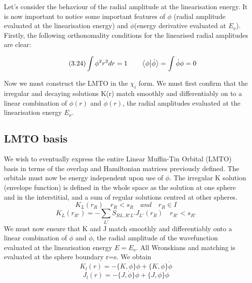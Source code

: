 \documentclass[12pt]{article}
\begin{document}
Let's consider the behaviour of the radial amplitude at the linearisation energy. It is now important to notice some important features of $\phi$ (radial amplitude evaluated at the linearisation energy) and $\dot{\phi}$(energy derivative evaluated at $E_\nu$). Firstly, the following orthonomality conditions for the linearised radial amplitudes are clear:

\begin{equation} \label{3.20} \tag{3.24}
\int \phi^2 r^2 dr=1 \qquad \bra{\phi}\ket{\dot{\phi}}=\int \dot{\phi}\phi=0
\end{equation}

Now we must construct the LMTO in the $\chi_i$ form. We must first confirm that the irregular and decaying solutions K(r) match smoothly and differentiably on to a linear combination of $\phi(r)$ and $\dot{\phi}(r)$, the radial amplitudes evaluated at the linearisation energy $E_\nu$. 

\subsection{LMTO basis}

We wish to eventually express the entire Linear Muffin-Tin Orbital (LMTO) basis in terms of the overlap and Hamiltonian matrices previously defined. The orbitals must now be energy independent upon use of $\phi$. The irregular K solution (envelope function) is defined in the whole space as the solution at one sphere and in the interstitial, and a sum of regular solutions centred at other spheres.
\begin{equation} \label{3.20} \tag{3.25}
K_L(r_R) \quad r_R<s_R \quad and \quad r_R\in I
\end{equation}
\begin{equation} \label{3.20} \tag{3.26}
K_L(r_{R'})= - \sum_{L'} S_{RL,R'L'} J_{L'}(r_R) \quad r_{R'}<s_{R'}
\end{equation}
We must now ensure that K and J match smoothly and differentiably onto a linear combination of $\phi$ and $\dot{\phi}$, the radial amplitude of the wavefunction evaluated at the linearisation energy $E=E_\nu$. All Wronskians and matching is evaluated at the sphere boundary r=s. We obtain
\begin{equation} \label{3.20} \tag{3.27}
K_l(r)=-\{ K,\dot{\phi} \}\phi + \{ K,\phi \} \dot{\phi}
\end{equation}
\begin{equation} \label{3.20} \tag{3.28}
J_l(r)=-\{ J,\dot{\phi} \}\phi + \{ J,\phi \} \dot{\phi}
\end{equation}
\end{document}
